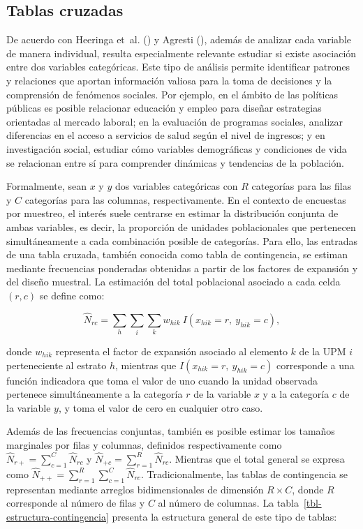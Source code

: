\documentclass[
  spanish,
  11pt,
  letterpaper,
  oneside,
  open=any]{scrbook}
\begin{document}
\subsection{Tablas cruzadas}\label{tablas-cruzadas}

De acuerdo con Heeringa et~al.
() y Agresti
(), además de analizar cada
variable de manera individual, resulta especialmente relevante estudiar
si existe asociación entre dos variables categóricas. Este tipo de
análisis permite identificar patrones y relaciones que aportan
información valiosa para la toma de decisiones y la comprensión de
fenómenos sociales. Por ejemplo, en el ámbito de las políticas públicas
es posible relacionar educación y empleo para diseñar estrategias
orientadas al mercado laboral; en la evaluación de programas sociales,
analizar diferencias en el acceso a servicios de salud según el nivel de
ingresos; y en investigación social, estudiar cómo variables
demográficas y condiciones de vida se relacionan entre sí para
comprender dinámicas y tendencias de la población.

Formalmente, sean \(x\) y \(y\) dos variables categóricas con \(R\)
categorías para las filas y \(C\) categorías para las columnas,
respectivamente. En el contexto de encuestas por muestreo, el interés
suele centrarse en estimar la distribución conjunta de ambas variables,
es decir, la proporción de unidades poblacionales que pertenecen
simultáneamente a cada combinación posible de categorías. Para ello, las
entradas de una tabla cruzada, también conocida como tabla de
contingencia, se estiman mediante frecuencias ponderadas obtenidas a
partir de los factores de expansión y del diseño muestral. La estimación
del total poblacional asociado a cada celda \((r,c)\) se define como:

\[
\hat{N}_{rc} = \sum_{h} \sum_{i} \sum_{k} w_{hik} \ I(x_{hik}=r,\ y_{hik}=c),
\]

donde \(w_{hik}\) representa el factor de expansión asociado al elemento
\(k\) de la UPM \(i\) perteneciente al estrato \(h\), mientras que
\(I(x_{hik}=r,\ y_{hik}=c)\) corresponde a una función indicadora que
toma el valor de uno cuando la unidad observada pertenece
simultáneamente a la categoría \(r\) de la variable \(x\) y a la
categoría \(c\) de la variable \(y\), y toma el valor de cero en
cualquier otro caso.

Además de las frecuencias conjuntas, también es posible estimar los
tamaños marginales por filas y columnas, definidos respectivamente como
\(\hat{N}_{r+} = \sum_{c=1}^{C} \hat{N}_{rc}\) y
\(\hat{N}_{+c} = \sum_{r=1}^{R} \hat{N}_{rc}\). Mientras que el total
general se expresa como
\(\hat{N}_{++} = \sum_{r=1}^{R}\sum_{c=1}^{C} \hat{N}_{rc}\).
Tradicionalmente, las tablas de contingencia se representan mediante
arreglos bidimensionales de dimensión \(R \times C\), donde \(R\)
corresponde al número de filas y \(C\) al número de columnas. La
tabla~\ref{tbl-estructura-contingencia} presenta la estructura general
de este tipo de tablas:
\end{document}
